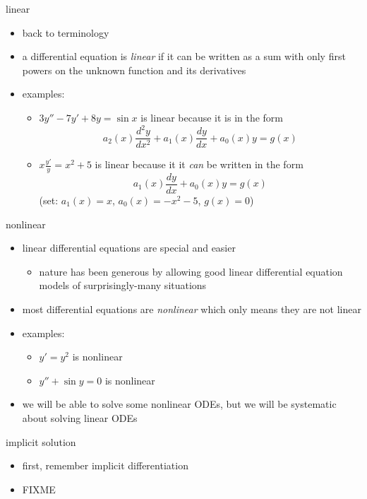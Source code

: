 \documentclass{beamer}
\begin{document}
\begin{frame}{linear}

\begin{itemize}
\item back to terminology
\item a differential equation is \emph{linear} if it can be written as a sum with only first powers on the unknown function and its derivatives
\item examples:
    \begin{itemize}
    \item $3 y'' - 7 y' + 8 y = \sin x$ is linear because it is in the form
        $$a_2(x) \frac{d^2y}{dx^2} + a_1(x) \frac{dy}{dx} + a_0(x) y = g(x)$$
    \item $x \frac{y'}{y} = x^2 + 5$ is linear because it it \emph{can} be written in the form
        $$a_1(x) \frac{dy}{dx} + a_0(x) y = g(x)$$
    (set: $a_1(x)=x$, $a_0(x)=-x^2-5$, $g(x)=0$)
    \end{itemize}
\end{itemize}
\end{frame}


\begin{frame}{nonlinear}

\begin{itemize}
\item linear differential equations are special and easier
    \begin{itemize}
    \item nature has been generous by allowing good linear differential equation models of surprisingly-many situations
    \end{itemize}
\item most differential equations are \emph{nonlinear} which only means they are not linear
\item examples:
    \begin{itemize}
    \item $y' = y^2$ is nonlinear
    \item $y'' + \sin y =0$ is nonlinear
    \end{itemize}
\item we will be able to solve some nonlinear ODEs, but we will be systematic about solving linear ODEs
\end{itemize}
\end{frame}


\begin{frame}{implicit solution}

\begin{itemize}
\item first, remember implicit differentiation
\item FIXME
\end{itemize}
\end{frame}
\end{document}
